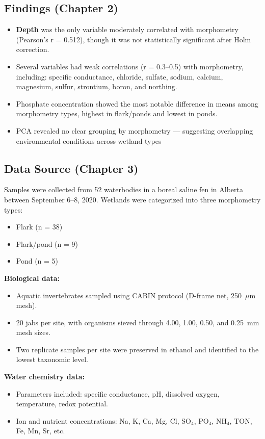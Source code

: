 \subsection{Findings (Chapter 2)}
\begin{itemize}
  \item \textbf{Depth} was the only variable moderately correlated with morphometry (Pearson’s r = 0.512), though it was not statistically significant after Holm correction.
  \item Several variables had weak correlations (r = 0.3–0.5) with morphometry, including: specific conductance, chloride, sulfate, sodium, calcium, magnesium, sulfur, strontium, boron, and northing.
  \item Phosphate concentration showed the most notable difference in means among morphometry types, highest in flark/ponds and lowest in ponds.
  \item PCA revealed no clear grouping by morphometry — suggesting overlapping environmental conditions across wetland types
\end{itemize}

\subsection{Data Source (Chapter 3)}
Samples were collected from 52 waterbodies in a boreal saline fen in Alberta between September 6–8, 2020. Wetlands were categorized into three morphometry types:
\begin{itemize}
  \item Flark (n = 38)
  \item Flark/pond (n = 9)
  \item Pond (n = 5)
\end{itemize}

\textbf{Biological data:}
\begin{itemize}
  \item Aquatic invertebrates sampled using CABIN protocol (D-frame net, 250~$\mu$m mesh).
  \item 20 jabs per site, with organisms sieved through 4.00, 1.00, 0.50, and 0.25~mm mesh sizes.
  \item Two replicate samples per site were preserved in ethanol and identified to the lowest taxonomic level.
\end{itemize}

\textbf{Water chemistry data:}
\begin{itemize}
  \item Parameters included: specific conductance, pH, dissolved oxygen, temperature, redox potential.
  \item Ion and nutrient concentrations: Na, K, Ca, Mg, Cl, SO$_4$, PO$_4$, NH$_4$, TON, Fe, Mn, Sr, etc.
\end{itemize}

